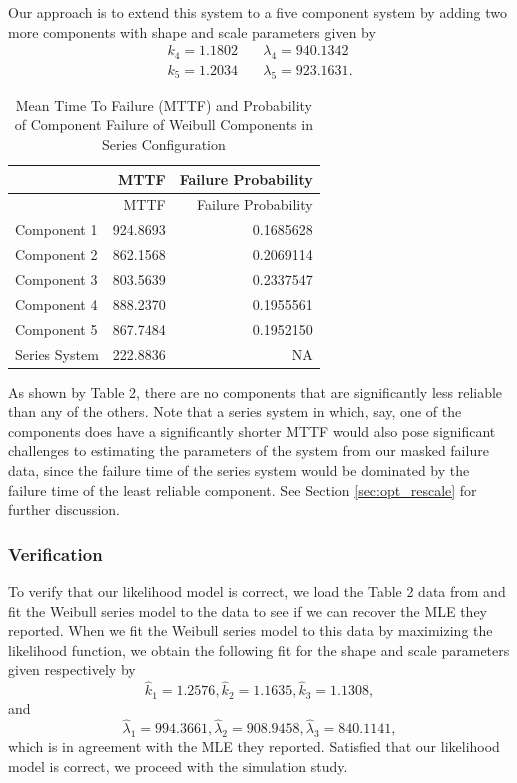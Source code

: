 \documentclass[
]{article}
\begin{document}
Our approach is to extend this system to a five component system by
adding two more components with shape and scale parameters given by
\begin{equation}
\begin{aligned}
    k_4 = 1.1802 &\quad \lambda_4 = 940.1342\\
    k_5 = 1.2034 &\quad \lambda_5 = 923.1631.
\end{aligned}
\end{equation}

\begin{longtable}[]{@{}lrr@{}}
\caption{Mean Time To Failure (MTTF) and Probability of Component
Failure of Weibull Components in Series Configuration}\tabularnewline
\toprule
& MTTF & Failure Probability\tabularnewline
\midrule
\endfirsthead
\toprule
& MTTF & Failure Probability\tabularnewline
\midrule
\endhead
Component 1 & 924.8693 & 0.1685628\tabularnewline
Component 2 & 862.1568 & 0.2069114\tabularnewline
Component 3 & 803.5639 & 0.2337547\tabularnewline
Component 4 & 888.2370 & 0.1955561\tabularnewline
Component 5 & 867.7484 & 0.1952150\tabularnewline
Series System & 222.8836 & NA\tabularnewline
\bottomrule
\end{longtable}

As shown by Table 2, there are no components that are significantly less
reliable than any of the others. Note that a series system in which,
say, one of the components does have a significantly shorter MTTF would
also pose significant challenges to estimating the parameters of the
system from our masked failure data, since the failure time of the
series system would be dominated by the failure time of the least
reliable component. See Section \ref{sec:opt_rescale} for further
discussion.

\hypertarget{verification}{%
\subsubsection*{Verification}\label{verification}}

To verify that our likelihood model is correct, we load the Table 2 data
from \citep{Huairu-2013} and fit the Weibull series model to the data to
see if we can recover the MLE they reported. When we fit the Weibull
series model to this data by maximizing the likelihood function, we
obtain the following fit for the shape and scale parameters given
respectively by \[
    \hat{k}_1 = 1.2576,
    \hat{k}_2 = 1.1635,
    \hat{k}_3 = 1.1308,
\] and \[
    \hat{\lambda}_1 = 994.3661,
    \hat{\lambda}_2 = 908.9458,
    \hat{\lambda}_3 = 840.1141,
\] which is in agreement with the MLE they reported. Satisfied that our
likelihood model is correct, we proceed with the simulation study.
\end{document}
